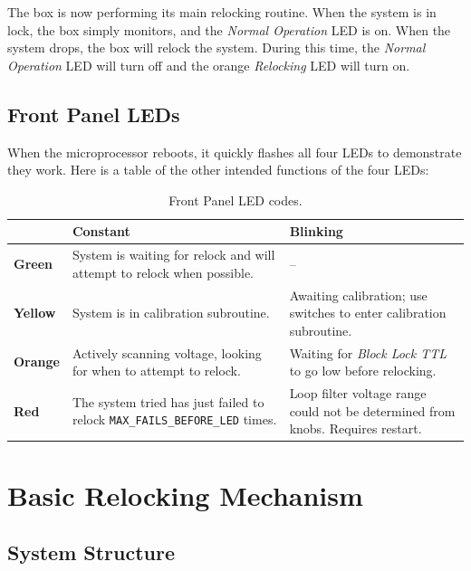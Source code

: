 \documentclass[10pt]{report}
\newcommand{\greenLEDName}[0] {\textit{Normal Operation}}
\newcommand{\orangeLEDName}[0] {\textit{Relocking}}
\begin{document}
The box is now performing its main relocking routine. When the system is in lock, the box simply monitors, and the \greenLEDName{} LED is on. When the system drops, the box will relock the system. During this time, the \greenLEDName{} LED will turn off and the orange \orangeLEDName{} LED will turn on.



\section{Front Panel LEDs}
When the microprocessor reboots, it quickly flashes all four LEDs to demonstrate they work. Here is a table of the other intended functions of the four LEDs:

\begin{table}[hbt]\centering
	\begin{tabular}{ | p{5em} | p{20em} | p{20em} | }
		\hline
		& \textbf{Constant} & \textbf{Blinking} \\\hline
		\textbf{Green} & System is waiting for relock and will attempt to relock when possible. & -- \\\hline
		\textbf{Yellow} & System is in calibration subroutine. & Awaiting calibration; use switches to enter calibration subroutine. \\\hline
		\textbf{Orange} & Actively scanning voltage, looking for when to attempt to relock. & Waiting for \textit{Block Lock TTL} to go low before relocking. \\\hline
		\textbf{Red} & The system tried has just failed to relock \texttt{MAX\_FAILS\_BEFORE\_LED} times. & Loop filter voltage range could not be determined from knobs. Requires restart. \\\hline
	\end{tabular}
	\caption{Front Panel LED codes.}\label{tab:leds}
\end{table}



\chapter{Basic Relocking Mechanism}
\label{chap:basicRelockingMechanism}

\section{System Structure}
\end{document}
